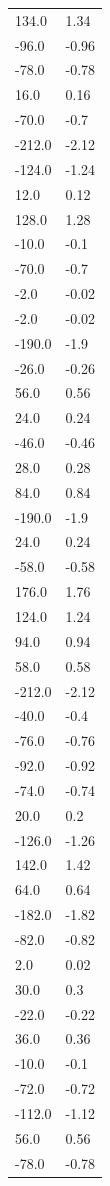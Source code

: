 \begin{longtable}{ll}
134.0 & 1.34 \\
-96.0 & -0.96 \\
-78.0 & -0.78 \\
16.0 & 0.16 \\
-70.0 & -0.7 \\
-212.0 & -2.12 \\
-124.0 & -1.24 \\
12.0 & 0.12 \\
128.0 & 1.28 \\
-10.0 & -0.1 \\
-70.0 & -0.7 \\
-2.0 & -0.02 \\
-2.0 & -0.02 \\
-190.0 & -1.9 \\
-26.0 & -0.26 \\
56.0 & 0.56 \\
24.0 & 0.24 \\
-46.0 & -0.46 \\
28.0 & 0.28 \\
84.0 & 0.84 \\
-190.0 & -1.9 \\
24.0 & 0.24 \\
-58.0 & -0.58 \\
176.0 & 1.76 \\
124.0 & 1.24 \\
94.0 & 0.94 \\
58.0 & 0.58 \\
-212.0 & -2.12 \\
-40.0 & -0.4 \\
-76.0 & -0.76 \\
-92.0 & -0.92 \\
-74.0 & -0.74 \\
20.0 & 0.2 \\
-126.0 & -1.26 \\
142.0 & 1.42 \\
64.0 & 0.64 \\
-182.0 & -1.82 \\
-82.0 & -0.82 \\
2.0 & 0.02 \\
30.0 & 0.3 \\
-22.0 & -0.22 \\
36.0 & 0.36 \\
-10.0 & -0.1 \\
-72.0 & -0.72 \\
-112.0 & -1.12 \\
56.0 & 0.56 \\
-78.0 & -0.78 \\

\end{longtable}
